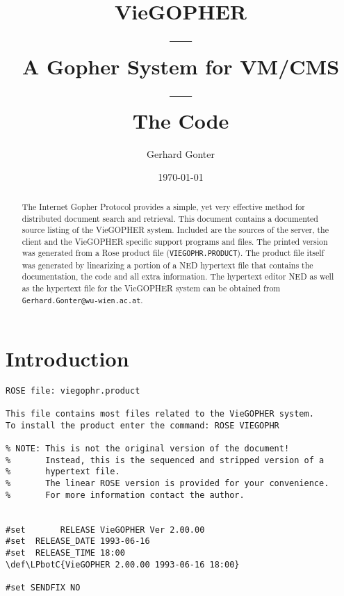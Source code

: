 %
\pagestyle{myheadings}

\def\LPtopA{{\tt VieGOPHER}}
\def\LPtopB{{\sl The Code}}

\title{VieGOPHER\\---\\A Gopher System for VM/CMS\\---\\{\small The Code}}
\author{Gerhard Gonter}
\date{\today}
\maketitle

\begin{abstract}
The Internet Gopher Protocol provides a simple, yet very effective
method for distributed document search and retrieval.  This document
contains a documented source listing of the VieGOPHER system.  Included
are the sources of the server, the client and the VieGOPHER specific
support programs and files.  The printed version was generated
from a Rose product file ({\tt VIEGOPHR.PRODUCT}).  The product
file itself was generated by linearizing a portion of a NED hypertext file
that contains the documentation, the code and all extra information.
The hypertext editor NED as well as the hypertext file for the VieGOPHER
system can be obtained from {\tt Gerhard.Gonter@wu-wien.ac.at}.
\end{abstract}

\pagebreak[4]
\begin{normalsize}
\def\LPtopC{Contents}
\tableofcontents
\end{normalsize}
\pagebreak[4]
\setcounter{page}{1}
\small
\section{Introduction}

\def\LPtopC{Introduction}

\def\LPtopD{~}

\def\LPtopF{~}

\begin{verbatim}
ROSE file: viegophr.product

This file contains most files related to the VieGOPHER system.
To install the product enter the command: ROSE VIEGOPHR

% NOTE: This is not the original version of the document!
%       Instead, this is the sequenced and stripped version of a
%       hypertext file.
%       The linear ROSE version is provided for your convenience.
%       For more information contact the author.


#set       RELEASE VieGOPHER Ver 2.00.00
#set  RELEASE_DATE 1993-06-16
#set  RELEASE_TIME 18:00
\def\LPbotC{VieGOPHER 2.00.00 1993-06-16 18:00}

#set SENDFIX NO
\end{verbatim}

